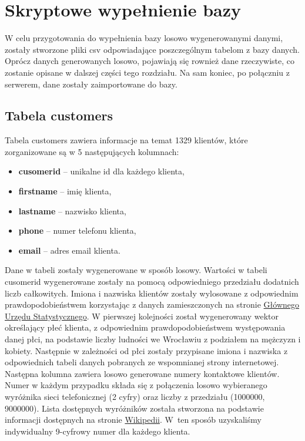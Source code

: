 \documentclass{article}
\begin{document}
	\section{Skryptowe wypełnienie bazy}
	
	W celu przygotowania do wypełnienia bazy losowo wygenerowanymi danymi, zostały stworzone pliki csv odpowiadające poszczególnym tabelom z bazy danych. Oprócz danych generowanych losowo, pojawiają się rownież dane rzeczywiste, co zostanie opisane w dalszej części tego rozdziału. Na sam koniec, po połączniu z serwerem, dane zostały zaimportowane do bazy.
	
	\subsection{Tabela customers}
		Tabela customers zawiera informacje na temat 1329 klientów, które zorganizowane są w  5 następujących kolumnach:
		\begin{itemize}
			\setlength{\itemsep}{-2pt}
			\item \textbf{cusomer\textunderscore id} – unikalne id dla każdego klienta,
			\item \textbf{first\textunderscore name} – imię klienta,
			\item \textbf{last\textunderscore name} – nazwisko klienta,
			\item \textbf{phone} – numer telefonu klienta,
			\item \textbf{email} – adres email klienta.
		\end{itemize}
		
		\noindent Dane w tabeli zostały wygenerowane w sposób losowy. Wartości w tabeli cusomer\textunderscore id wygenerowane zostały na pomocą odpowiedniego przedziału  dodatnich liczb całkowitych. Imiona i nazwiska klientów zostały wylosowane z odpowiednim prawdopodobieństwem korzystając z danych zamieszczonych na stronie \href{https://stat.gov.pl/}{Głównego Urzędu Statystycznego}. W pierwszej kolejności został wygenerowany wektor określający płeć klienta, z odpowiednim prawdopodobieństwem występowania danej płci, na podstawie liczby ludności we Wrocławiu z podziałem na mężczyzn i kobiety. Następnie w zależności od płci zostały przypisane imiona i nazwiska z odpowiednich tabeli danych pobranych ze wspomnianej strony internetowej.\\
		
		\noindent Następna kolumna zawiera losowo generowane numery kontaktowe klientów. Numer w każdym przypadku składa się z połączenia losowo wybieranego wyróżnika sieci telefonicznej (2 cyfry) oraz liczby z przedziału (1000000, 9000000). Lista dostępnych wyróżników została stworzona na podstawie informacji dostępnych na stronie \href{https://pl.wikipedia.org/wiki/Numery_telefoniczne_w_Polsce}{Wikipedii}. W~ten sposób uzyskaliśmy indywidualny 9-cyfrowy numer dla każdego klienta.\\
		
\end{document}

